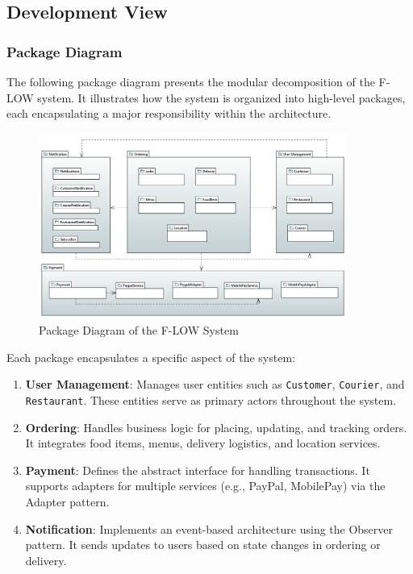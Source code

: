 \subsection{Development View}

\subsubsection{Package Diagram}

The following package diagram presents the modular decomposition of the F-LOW system. It illustrates how the system is organized into high-level packages, each encapsulating a major responsibility within the architecture.

\begin{figure}[H]
    \centering
    \includegraphics[width=0.9\textwidth]{FIGS/PackageDiagram.jpg}
    \caption{Package Diagram of the F-LOW System}
\end{figure}

Each package encapsulates a specific aspect of the system:

\begin{enumerate}
    \item \textbf{User Management}: Manages user entities such as \texttt{Customer}, \texttt{Courier}, and \texttt{Restaurant}. These entities serve as primary actors throughout the system.
    \item \textbf{Ordering}: Handles business logic for placing, updating, and tracking orders. It integrates food items, menus, delivery logistics, and location services.
    \item \textbf{Payment}: Defines the abstract interface for handling transactions. It supports adapters for multiple services (e.g., PayPal, MobilePay) via the Adapter pattern.
    \item \textbf{Notification}: Implements an event-based architecture using the Observer pattern. It sends updates to users based on state changes in ordering or delivery.
\end{enumerate}

